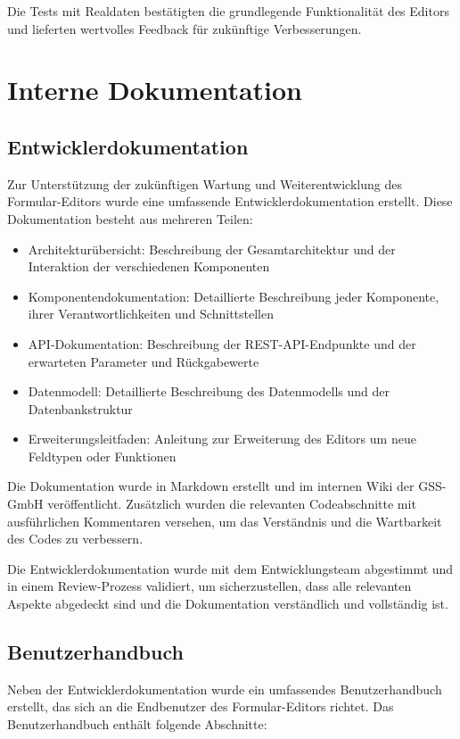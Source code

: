 \documentclass[a4paper,11pt]{article}
\begin{document}
\noindent Die Tests mit Realdaten bestätigten die grundlegende Funktionalität des Editors und lieferten wertvolles Feedback für zukünftige Verbesserungen.

\section{Interne Dokumentation}
\subsection{Entwicklerdokumentation}
Zur Unterstützung der zukünftigen Wartung und Weiterentwicklung des Formular-Editors wurde eine umfassende Entwicklerdokumentation erstellt. Diese Dokumentation besteht aus mehreren Teilen:

\begin{itemize}
  \item Architekturübersicht: Beschreibung der Gesamtarchitektur und der Interaktion der verschiedenen Komponenten
  \item Komponentendokumentation: Detaillierte Beschreibung jeder Komponente, ihrer Verantwortlichkeiten und Schnittstellen
  \item API-Dokumentation: Beschreibung der REST-API-Endpunkte und der erwarteten Parameter und Rückgabewerte
  \item Datenmodell: Detaillierte Beschreibung des Datenmodells und der Datenbankstruktur
  \item Erweiterungsleitfaden: Anleitung zur Erweiterung des Editors um neue Feldtypen oder Funktionen
\end{itemize}

\noindent Die Dokumentation wurde in Markdown erstellt und im internen Wiki der GSS-GmbH veröffentlicht. Zusätzlich wurden die relevanten Codeabschnitte mit ausführlichen Kommentaren versehen, um das Verständnis und die Wartbarkeit des Codes zu verbessern.

\noindent Die Entwicklerdokumentation wurde mit dem Entwicklungsteam abgestimmt und in einem Review-Prozess validiert, um sicherzustellen, dass alle relevanten Aspekte abgedeckt sind und die Dokumentation verständlich und vollständig ist.

\subsection{Benutzerhandbuch}
Neben der Entwicklerdokumentation wurde ein umfassendes Benutzerhandbuch erstellt, das sich an die Endbenutzer des Formular-Editors richtet. Das Benutzerhandbuch enthält folgende Abschnitte:
\end{document}
